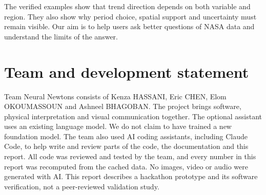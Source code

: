 \documentclass[10pt,a4paper,twocolumn]{article}
\begin{document}
The verified examples show that trend direction depends on both variable and region. They also show why period choice, spatial support and uncertainty must remain visible. Our aim is to help users ask better questions of NASA data and understand the limits of the answer.

\section*{Team and development statement}
Team Neural Newtons consists of Kenza HASSANI, Eric CHEN, Elom OKOUMASSOUN and Ashneel BHAGOBAN. The project brings software, physical interpretation and visual communication together. The optional assistant uses an existing language model. We do not claim to have trained a new foundation model. The team also used AI coding assistants, including Claude Code, to help write and review parts of the code, the documentation and this report. All code was reviewed and tested by the team, and every number in this report was recomputed from the cached data. No images, video or audio were generated with AI. This report describes a hackathon prototype and its software verification, not a peer-reviewed validation study.
\end{document}

